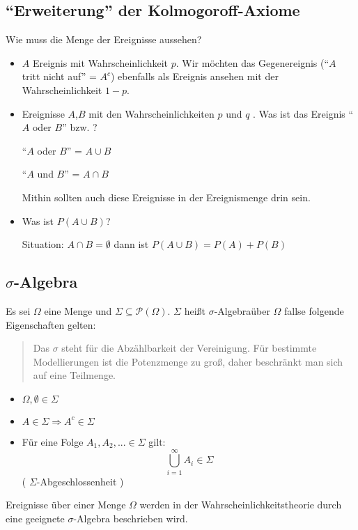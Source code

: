 \subsection{``Erweiterung'' der Kolmogoroff-Axiome}

Wie muss die Menge der Ereignisse aussehen?
\begin{itemize}
 \item $A$ Ereignis mit Wahrscheinlichkeit $p$. Wir möchten das Gegenereignis (``$A$ tritt nicht auf'' = $A^c$) ebenfalls als Ereignis ansehen mit der Wahrscheinlichkeit $1-p$.
 \item Ereignisse $A$,$B$ mit den Wahrscheinlichkeiten $p$ und $q$ . Was ist das Ereignis ``$A$ oder $B$'' bzw. ?

 ``$A$ oder $B$'' = $A \cup B$

 ``$A$ und $B$'' = $A \cap B$

 Mithin sollten auch diese Ereignisse in der Ereignismenge drin sein.
 \item Was ist $P(A \cup B)$?

Situation: $A \cap B = \emptyset$ dann ist $P(A \cup B) = P(A) + P(B)$

\end{itemize}
\subsection{$\sigma$-Algebra}
\begin{definition}
Es sei $\Omega$ eine Menge und $\Sigma \subseteq \mathcal P(\Omega)$. $\Sigma$ heißt $\sigma$-Algebraüber $\Omega$ fallse folgende Eigenschaften gelten:
\end{definition}
\begin{quote}
 Das $\sigma$ steht für die Abzählbarkeit der Vereinigung. Für bestimmte Modellierungen ist die Potenzmenge zu groß, daher beschränkt man sich auf eine Teilmenge.
\end{quote}

\begin{itemize}
 \item $\Omega, \emptyset \in \Sigma$
 \item $A \in \Sigma \Rightarrow A^c \in \Sigma$
 \item Für eine Folge $A_1,A_2,... \in \Sigma$ gilt:
$$ \bigcup_{i=1}^\infty A_i \in \Sigma$$ ( $\Sigma$-Abgeschlossenheit )
\end{itemize}
Ereignisse über einer Menge $\Omega$ werden in der Wahrscheinlichkeitstheorie durch eine geeignete $\sigma$-Algebra beschrieben wird.

